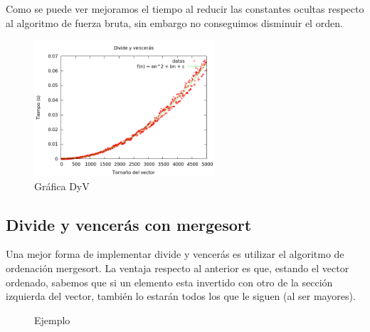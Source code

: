 \begin{center}
\end{center}

Como se puede ver mejoramos el tiempo al reducir las constantes ocultas respecto al algoritmo de fuerza bruta, sin embargo no conseguimos disminuir el orden.

\begin{figure}[h] 
\centering
	\includegraphics[width=0.6\textwidth]{../Opcional/Graficas/dyv_bruno.png}
	\caption{Gráfica DyV} 
	\label{fig:perros} 
\end{figure}


\subsection{Divide y vencerás con mergesort}
Una mejor forma de implementar divide y vencerás es utilizar el algoritmo de ordenación mergesort. La ventaja respecto al anterior es que, estando el vector ordenado, sabemos que si un elemento esta invertido con otro de la sección izquierda del vector, también lo estarán todos los que le siguen (al ser mayores).

\begin{figure}[h] 
\centering
	\caption{Ejemplo} 
\end{figure}

